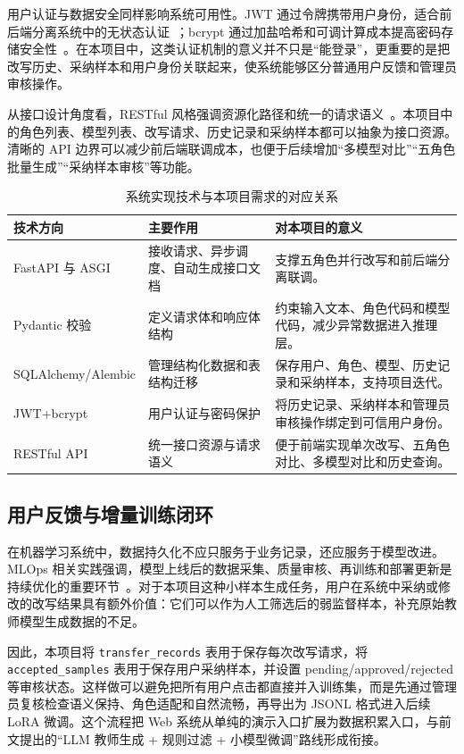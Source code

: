 \documentclass[12pt,a4paper]{ctexart}
\begin{document}
用户认证与数据安全同样影响系统可用性。JWT 通过令牌携带用户身份，适合前后端分离系统中的无状态认证~\cite{jwt2023}；bcrypt 通过加盐哈希和可调计算成本提高密码存储安全性~\cite{bcrypt2023}。在本项目中，这类认证机制的意义并不只是“能登录”，更重要的是把改写历史、采纳样本和用户身份关联起来，使系统能够区分普通用户反馈和管理员审核操作。

从接口设计角度看，RESTful 风格强调资源化路径和统一的请求语义~\cite{restful2020}。本项目中的角色列表、模型列表、改写请求、历史记录和采纳样本都可以抽象为接口资源。清晰的 API 边界可以减少前后端联调成本，也便于后续增加“多模型对比”“五角色批量生成”“采纳样本审核”等功能。

\begin{table}[H]
\centering
\caption{系统实现技术与本项目需求的对应关系}
\label{tab:web_tech_mapping}
\begin{tabular}{p{3.2cm}|p{4.4cm}|p{5cm}}
\toprule
技术方向 & 主要作用 & 对本项目的意义 \\
\midrule
FastAPI 与 ASGI & 接收请求、异步调度、自动生成接口文档 & 支撑五角色并行改写和前后端分离联调。 \\
Pydantic 校验 & 定义请求体和响应体结构 & 约束输入文本、角色代码和模型代码，减少异常数据进入推理层。 \\
SQLAlchemy/Alembic & 管理结构化数据和表结构迁移 & 保存用户、角色、模型、历史记录和采纳样本，支持项目迭代。 \\
JWT+bcrypt & 用户认证与密码保护 & 将历史记录、采纳样本和管理员审核操作绑定到可信用户身份。 \\
RESTful API & 统一接口资源与请求语义 & 便于前端实现单次改写、五角色对比、多模型对比和历史查询。 \\
\bottomrule
\end{tabular}
\end{table}

\subsection{用户反馈与增量训练闭环}

在机器学习系统中，数据持久化不应只服务于业务记录，还应服务于模型改进。MLOps 相关实践强调，模型上线后的数据采集、质量审核、再训练和部署更新是持续优化的重要环节~\cite{mlops2023}。对于本项目这种小样本生成任务，用户在系统中采纳或修改的改写结果具有额外价值：它们可以作为人工筛选后的弱监督样本，补充原始教师模型生成数据的不足。

因此，本项目将 \texttt{transfer\_records} 表用于保存每次改写请求，将 \texttt{accepted\_samples} 表用于保存用户采纳样本，并设置 pending/approved/rejected 等审核状态。这样做可以避免把所有用户点击都直接并入训练集，而是先通过管理员复核检查语义保持、角色适配和自然流畅，再导出为 JSONL 格式进入后续 LoRA 微调。这个流程把 Web 系统从单纯的演示入口扩展为数据积累入口，与前文提出的“LLM 教师生成 + 规则过滤 + 小模型微调”路线形成衔接。
\end{document}
